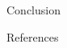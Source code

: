 \documentclass[final,hyperref={pdfpagelabels=false}]{beamer}
\begin{document}
\begin{frame}[t]
\begin{columns}[t]
\begin{column}{.465\textwidth}
\begin{block}{Conclusion}
\end{block}


\begin{block}{References}
        
\nocite{*} %
\small{
}

\end{block}









\end{column} %

\begin{column}{.015\textwidth}\end{column} %

\end{columns} %

\end{frame} %
\end{document}
